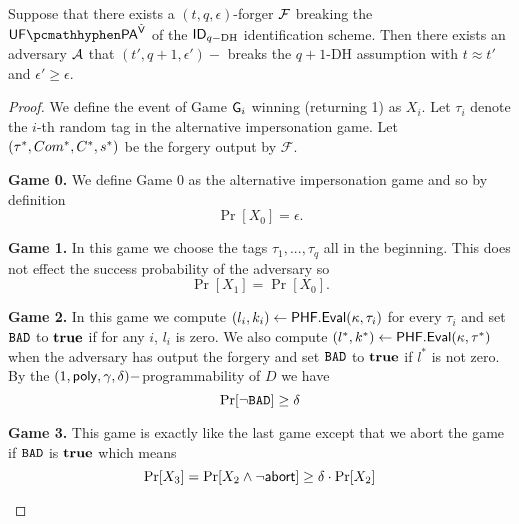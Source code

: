 \begin{theorem}
Suppose that there exists a $(t, q, \epsilon)$-forger $\mathcal{F}$ breaking the $\imp^{\IDAltV}$ of the $\mathsf{ID}_{q-\text{DH}}$ identification scheme. Then there exists an adversary $\mathcal{A}$ that $(t',q+1,\epsilon')-$ breaks the $q+1$-DH assumption with $t \approx t'$ and 
$\epsilon' \geq \epsilon.$
\end{theorem}
\begin{proof}
We define the event of Game $\mathsf{G}_i$ winning (returning 1) as $X_i$. Let $\tau_i$ denote the $i$-th random tag in the alternative impersonation game. Let $(\tau^*,Com^*, C^*, s^*)$ be the forgery output by $\mathcal{F}$.
\begin{description}[wide,itemindent=\labelsep]
\item [] \textbf{Game 0.} We define Game 0 as the alternative impersonation game and so by definition
$$\Pr[X_0] = \epsilon.$$
\item [] \textbf{Game 1.} In this game we choose the tags $\tau_1,...,\tau_q$ all in the beginning. This does not effect the success probability of the adversary so 
$$\Pr[X_1] = \Pr[X_0].$$
\item [] \textbf{Game 2.} In this game we compute
$(l_i,k_i) \leftarrow \mathsf{PHF}.\mathsf{Eval}(\kappa,\tau_i)$ for every $\tau_i$ and set $\texttt{BAD}$ to $\textbf{true}$ if for any $i$, $l_i$ is zero. We also compute $(l^*,k^*) \leftarrow \mathsf{PHF}.\mathsf{Eval}(\kappa,\tau^*)$ when the adversary has output the forgery and set $\texttt{BAD}$ to $\textbf{true}$ if $l^*$ is not zero.
\\
By the $(1, \mathsf{poly}, \gamma, \delta)-$programmability of $D$ we have
$$\Pr[\neg \texttt{BAD}] \geq \delta$$
\item [] \textbf{Game 3.} This game is exactly like the last game except that we abort the game if $\texttt{BAD}$ is $\textbf{true}$ which means
$$\Pr[X_3] = \Pr[X_2 \land \neg \mathsf{abort}] \geq \delta \cdot \Pr[X_2]$$
\end{description}


\begin{figure}[htb!]
    \nicoresetlinenr
\end{figure}
\end{proof}
